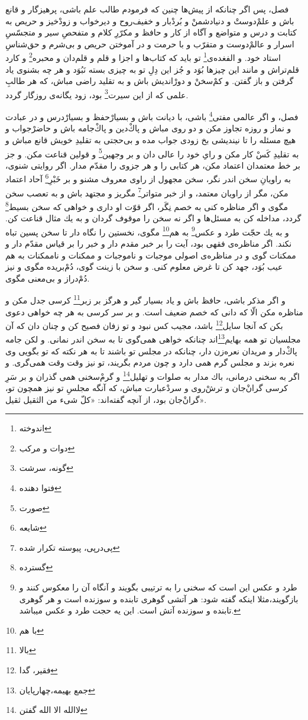 فصل، پس اگر چنانكه از پيش‌ها چنين كه فرمودم طالب علم باشى، پرهيزگار و قانع باش و علم‌ْدوستْ و دنيا‌دشمنْ و بُردْبار و خفيف‌روح و دير‌خواب و زودْخيز و حريص به كتابت و درس و متواضع و آگاه از كار و حافظ و مكرّرِ كلام و متفحصِ سير و متجسّسِ اسرار و عالمْ‌دوست و متقرّب و با حرمت و در آموختن حريص و بى‌شرم و حق‌شناسِ استاد خود. و الفغده‌ی\footnote{اندوخته} تو بايد كه كتاب‌ها و اجزا و قلم و قلم‌دان و محبره\footnote{دوات و مرکب} و كارد قلم‌تراش و مانند اين چيزها بُوَد و جُز اين دِلِ تو به چيزى بسته نَبُوَد و هر چه بشنوى ياد گرفتن و باز گفتن. و كم‌ْسخنْ و دورْانديش باش و به تقليد راضى مباش، كه هر طالبِ علمى كه از اين سيرت\footnote{گونه، سرشت} بود، زود يگانه‌ی روزگار گردد.

فصل، و اگر عالمى مفتى\footnote{فتوا دهنده} باشى، با ديانت باش و بسيارْ‌حفظ و بسيارْدرس و در عبادت و نماز و روزه تجاوز مكن و دو روى مباش و پاكْ‌دين و پاكْ‌جامه باش و حاضرْجواب و هيچ مسئله را تا نينديشى بخ زودى جواب مده و بى‌حجتى به تقليدِ خويش قانع مباش و به تقليدِ كَسْ كار مكن و راىِ خود را عالى دان و بر وجهين\footnote{صورت} و قولين قناعت مكن. و جز بر خط معتمدان اعتماد مكن، هر كتابى را و هر جزوى را مقدّم مدار. اگر روايتى شنوى، به راويانِ سخن اندر نگر، سخن مجهول از راوى معروف مشنو و بر خَبْرِ\footnote{شایعه} آحاد اعتماد مكن، مگر از راويان معتمد، و از خبر متواتر\footnote{پی‌درپی، پیوسته تکرار شده} مگريز و مجتهد باش و به تعصب سخن مگوى و اگر مناظره كنى به خصم نِگَر، اگر قوّت او دارى و خواهى كه سخن بسيط\footnote{گسترده} گردد، مداخله كن به مسئل‌ها و اگر نه سخن را موقوف گردان و به يك مثال قناعت كن. و به يك حجّت طرد و عكس\footnote{طرد و عکس این است که سخنی را به ترتیبی بگویند و آنگاه آن را معکوس کنند و بازگویند،مثلا اینکه گفته شود: هر آتشی گوهری تابنده و سوزنده است و هر گوهری تابنده و سوزنده آتش است. این یه حجت طرد و عکس میباشد.} به هم\footnote{با هم} مگوى، نخستين را نگاه دار تا سخن پسين تباه نكند. اگر مناظره‌ی فقهى بود، آيت را بر خبر مقدم دار و خبر را بر قياس مقدّم دار و ممكنات گوى و در مناظره‌ی اصولى موجبات و ناموجبات و ممكنات و ناممكنات به هم عيب بُوَد، جهد كن تا غرض معلوم كنى. و سخن با زينت گوى، دُم‌ْبريده مگوى و نيز دُم‌ْدراز و بى‌معنى مگوى.

و اگر مذكر باشى، حافظ باش و ياد بسيار گير و هرگز بر زبر\footnote{بالا} كرسى جدل مكن و مناظره مكن الّا كه دانى كه خصم ضعيف است. و بر سر كرسى به هر چه خواهى دعوى بكن كه آنجا سايل\footnote{فقیر، گدا} باشد، مجيب كس نبود و تو زفان فصيح كن و چنان دان كه آن مجلسيان تو همه بهايم‌\footnote{جمع بهیمه،‌چهارپایان}اند چنانكه خواهى همى‌گوى تا به سخن اندر نمانى. و لكن جامه پاك‌ْدار و مريدان نعره‌زن دار، چنانكه در مجلس تو باشند تا به هر نكته كه تو بگويى وى نعره بزند و مجلس گرم همى دارد و چون مردم بگريند، تو نيز وقت وقت همى‌گرى. و اگر به سخنى درمانى، باك مدار به صلوات و تهليل\footnote{لاالله الا الله گفتن} و گرم‌ْسخنى همى گذران و بر سَرِ كرسى گران‌ْجان و ترش‌ْروى  و سردْعبارت مباش، كه آنگه مجلسِ تو نيز همچون تو، گرانْ‌جان بود، از آنچه گفته‌اند: «كلّ شىء من الثقيل ثقيل».

